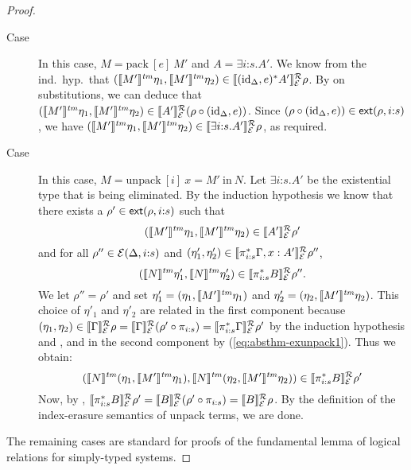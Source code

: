 \begin{proof}
\begin{description}
  \item[Case ] In this case, $M = \mathrm{pack}\ [e]\
    M'$ and $A = \exists i\mathord:s.A'$. We know from the
    ind.~hyp.~that $(\llbracket M' \rrbracket^{\mathit{tm}}\eta_1, \llbracket M' \rrbracket^{\mathit{tm}}\eta_2) \in
    \llbracket (\mathrm{id}_\Delta, e)^*A' \rrbracket^{\mathcal{R}}_{\mathcal{E}}{\rho}$. By
     on substitutions, we can deduce
    that $(\llbracket M' \rrbracket^{\mathit{tm}}\eta_1, \llbracket M' \rrbracket^{\mathit{tm}}\eta_2) \in
    \llbracket A' \rrbracket^{\mathcal{R}}_{\mathcal{E}}{(\rho \circ (\mathrm{id}_\Delta, e))}$. Since $(\rho
    \circ (\mathrm{id}_\Delta, e)) \in \mathsf{ext}(\rho,i\mathord:s)$, we have
    $(\llbracket M' \rrbracket^{\mathit{tm}}\eta_1, \llbracket M' \rrbracket^{\mathit{tm}}\eta_2) \in \llbracket \exists
      i\mathord:s.A' \rrbracket^{\mathcal{R}}_{\mathcal{E}}{\rho}$, as required.
  \item[Case ] In this case, $M = \mathrm{unpack}\
    [i]\ x = M'\ \mathrm{in}\ N$. Let $\exists i\mathord:s. A'$ be the
    existential type that is being eliminated. By the induction
    hypothesis we know that there exists a $\rho' \in \mathsf{ext}(\rho,i\mathord:s)$ such that
    \begin{equation}
      \label{eq:absthm-exunpack1}
      (\llbracket M' \rrbracket^{\mathit{tm}}\eta_1, \llbracket M' \rrbracket^{\mathit{tm}}\eta_2) \in \llbracket A' \rrbracket^{\mathcal{R}}_{\mathcal{E}}{\rho'}
    \end{equation}
    and for all $\rho'' \in \mathcal{E}(\Delta,i\mathord:s)$ and
    $(\eta'_1,\eta'_2) \in \llbracket \pi_{i\mathord:s}^*\Gamma, x :
      A' \rrbracket^{\mathcal{R}}_{\mathcal{E}}{\rho''}$,
    \begin{displaymath}
      (\llbracket N \rrbracket^{\mathit{tm}}\eta'_1, \llbracket N \rrbracket^{\mathit{tm}}\eta'_2) \in \llbracket \pi_{i\mathord:s}^*B \rrbracket^{\mathcal{R}}_{\mathcal{E}}{\rho''}.
    \end{displaymath}
    We let $\rho'' = \rho'$ and set $\eta'_1 = (\eta_1,
    \llbracket M' \rrbracket^{\mathit{tm}}\eta_1)$ and $\eta'_2 = (\eta_2,
    \llbracket M' \rrbracket^{\mathit{tm}}\eta_2)$. This choice of $\eta'_1$ and $\eta'_2$ are
    related in the first component because $(\eta_1, \eta_2) \in
    \llbracket \Gamma \rrbracket^{\mathcal{R}}_{\mathcal{E}}{\rho} = \llbracket \Gamma \rrbracket^{\mathcal{R}}_{\mathcal{E}}{(\rho'
      \circ \pi_{i\mathord:s})} =
    \llbracket \pi_{i\mathord:s}^*\Gamma \rrbracket^{\mathcal{R}}_{\mathcal{E}}{\rho'}$ by the
    induction hypothesis and , and in the
    second component by (\ref{eq:absthm-exunpack1}). Thus we obtain:
    \begin{displaymath}
      (\llbracket N \rrbracket^{\mathit{tm}}(\eta_1,\llbracket M' \rrbracket^{\mathit{tm}}\eta_1),
       \llbracket N \rrbracket^{\mathit{tm}}(\eta_2,\llbracket M' \rrbracket^{\mathit{tm}}\eta_2)) \in \llbracket \pi_{i\mathord:s}^*B \rrbracket^{\mathcal{R}}_{\mathcal{E}}{\rho'}
    \end{displaymath}
    Now, by \lemref{lem:tyeqsubst-relational},
    $\llbracket \pi_{i\mathord:s}^*B \rrbracket^{\mathcal{R}}_{\mathcal{E}}{\rho'} =
    \llbracket B \rrbracket^{\mathcal{R}}_{\mathcal{E}}{(\rho' \circ \pi_{i\mathord:s})} =
    \llbracket B \rrbracket^{\mathcal{R}}_{\mathcal{E}}{\rho}$. By the definition of the
    index-erasure semantics of $\mathrm{unpack}$ terms, we are done.
  \end{description}
  The remaining cases are standard for proofs of the fundamental lemma
  of logical relations for simply-typed systems.
\end{proof}

